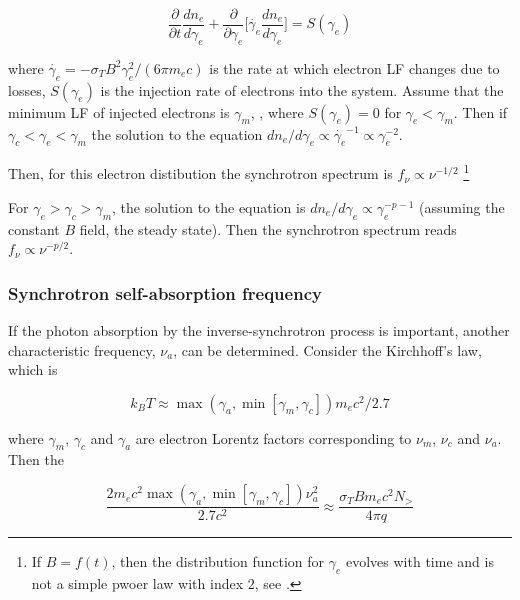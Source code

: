\begin{equation}
\frac{\partial }{\partial t}\frac{d n_e}{d\gamma_e} + \frac{\partial}{\partial \gamma_e}\Big[ \dot{\gamma_e}\frac{dn_e}{d\gamma_e} \Big] = S(\gamma_e)
\end{equation}

where $\dot{\gamma_e} = -\sigma_T B^2 \gamma_e^2 / (6\pi m_e c)$ is the rate at which electron \ac{LF} changes due to losses, $S(\gamma_e)$ is the injection rate of electrons into the system.
Assume that the minimum \ac{LF} of injected electrons is $\gamma_m$, \eg, where $S(\gamma_e) = 0$ for $\gamma_e < \gamma_m$.
Then if $\gamma_c < \gamma_e < \gamma_m$ the solution to the equation $dn_{e}/d\gamma_e \propto \dot{\gamma_e}^{-1} \propto \gamma_e^{-2}$.

Then, for this electron distibution the synchrotron spectrum is $f_{\nu}\propto\nu^{-1/2}$ 
\footnote{If $B=f(t)$, then the distribution function for $\gamma_e$ evolves with time and is not a simple pwoer law with index $2$, see \citet{Uhm:2013gwa}.}

For $\gamma_e > \gamma_c > \gamma_m$, the solution to the equation is $dn_e/d\gamma_e \propto \gamma_e^{-p-1}$ (assuming the constant $B$ field, the steady state). Then the synchrotron spectrum reads $f_{\nu}\propto\nu^{-p/2}$.


\subsubsection{Synchrotron self-absorption frequency}

If the photon absorption by the inverse-synchrotron process is important, another characteristic frequency, $\nu_a$, can be determined. Consider the Kirchhoff's law,  which is

\begin{equation}
k_BT\approx \max(\gamma_a,\min[\gamma_m,\gamma_c])m_e c^2 / 2.7
\end{equation}

where $\gamma_m$, $\gamma_c$ and $\gamma_a$ are electron Lorentz factors corresponding to $\nu_m$, $\nu_c$ and $\nu_a$.
Then the 

\begin{equation}
\frac{2m_ec^2\max(\gamma_a,\min[\gamma_m,\gamma_c])\nu_a^2}{2.7c^2}\approx\frac{\sigma_T B m_e c^2 N_>}{4 \pi q}
\end{equation}

